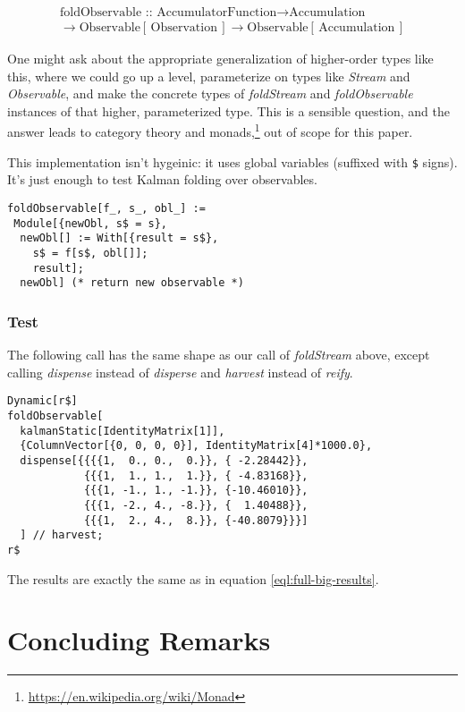\documentclass[10pt,oneside,x11names]{article}
\begin{document}
\begin{align*}
\text{foldObservable :: }
\text{AccumulatorFunction}
\rightarrow
\text{Accumulation}\\
\rightarrow
\text{Observable}\left[\,\text{Observation}\,\right]
\rightarrow
\text{Observable}\left[\,\text{Accumulation}\,\right]
\end{align*}

One might ask about the appropriate generalization of higher-order types like
this, where we could go up a level, parameterize on types like \emph{Stream} and
\emph{Observable}, and make the concrete types of \emph{foldStream} and \emph{foldObservable}
instances of that higher, parameterized type. This is a sensible question, and
the answer leads to category theory and monads,\footnote{\url{https://en.wikipedia.org/wiki/Monad}} out of scope for this
paper.

This implementation isn't hygeinic: it uses global variables (suffixed with \texttt{\$}
signs). It's just enough to test Kalman folding over observables.

\begin{verbatim}
foldObservable[f_, s_, obl_] :=
 Module[{newObl, s$ = s},
  newObl[] := With[{result = s$},
    s$ = f[s$, obl[]];
    result];
  newObl] (* return new observable *)
\end{verbatim}

\subsubsection{Test}
\label{sec:orgheadline14}

The following call has the same shape as our call of \emph{foldStream} above, except
calling \emph{dispense} instead of \emph{disperse} and \emph{harvest} instead of \emph{reify}.

\begin{verbatim}
Dynamic[r$]
foldObservable[
  kalmanStatic[IdentityMatrix[1]],
  {ColumnVector[{0, 0, 0, 0}], IdentityMatrix[4]*1000.0},
  dispense[{{{{1,  0., 0.,  0.}}, { -2.28442}}, 
            {{{1,  1., 1.,  1.}}, { -4.83168}}, 
            {{{1, -1., 1., -1.}}, {-10.46010}}, 
            {{{1, -2., 4., -8.}}, {  1.40488}}, 
            {{{1,  2., 4.,  8.}}, {-40.8079}}}]
  ] // harvest;
r$
\end{verbatim}

The results are exactly the same as in equation \ref{eql:full-big-results}. 

\section{Concluding Remarks}
\label{sec:orgheadline17}
\end{document}
